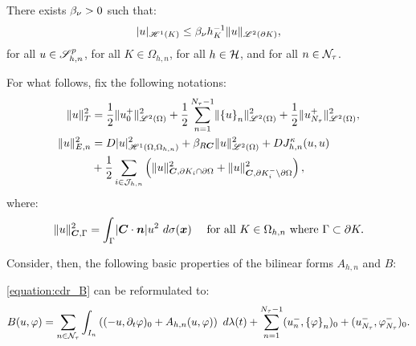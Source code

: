 \begin{lemma}
    There exists $\beta_{\nu} > 0$ such that:
    \begin{gather}
        \lvert u \rvert_{\mathscr{H}^{1}(K)} \leq \beta_{\nu} h_K^{-1} \lVert u \rVert_{\mathscr{L}^{2}(\partial K)},
    \end{gather}
    for all $u \in \mathscr{S}^p_{h, n}$, for all $K \in \Omega_{h, n}$, for all $h \in \mathcal{H}$, and for all $n \in \mathcal{N}_{\tau}$.
\end{lemma}

For what follows, fix the following notations:
\begin{align} %
    \lVert u \rVert_{T}^2 &= \frac{1}{2} \lVert u_0^+ \rVert_{\SpaceLp{2}(\Omega)}^2 + \frac{1}{2} \sum_{n = 1}^{\nTimeIndices - 1} \lVert \left\{ u \right\}_n \rVert_{\SpaceLp{2}(\Omega)}^2 + \frac{1}{2} \lVert u_{\nTimeIndices}^+ \rVert_{\SpaceLp{2}(\Omega)}^2, \\
    \lVert u \rVert_{E, n}^2 &= \Diffusion \lvert u \rvert_{\SpaceHk{1}(\Omega, \Omega_{h, n})}^2 + \BoundC{\Reaction \Convection} \lVert u \rVert_{\SpaceLp{2}(\Omega)}^2 + \Diffusion J^{\kappa}_{h, n}(u, u) \\
    &+ \frac{1}{2} \sum_{i \in \SpaceTimeIndices} \left( \lVert u \rVert_{\Convection, \partial K_i \cap \partial \Omega}^2 + \lVert u \rVert_{\Convection, \partial K_i^- \setminus \partial \Omega}^2 \right),
\end{align}
where:
\begin{gather}
    \lVert u \rVert_{\bm{C}, \Gamma}^2 = \int_{\Gamma} \lvert \bm{C} \cdot \bm{n} \rvert u^2 ~ d \sigma(\bm{x}) \quad \text{ for all } K \in \Omega_{h, n} \text{ where } \Gamma \subset \partial K.
\end{gather}

Consider, then, the following basic properties of the bilinear forms $A_{h, n}$ and $B$:

\begin{lemma}[Reformulation of $B$]
    \cref{equation:cdr_B} can be reformulated to:
    \begin{gather}
        B(u, \varphi) = \sum_{n \in \mathcal{N}_{\tau}} \int_{I_n} \left( (-u, \partial_t \varphi )_0 + A_{h, n}(u, \varphi) \right) ~ d \lambda(t) + \sum_{n = 1}^{N_{\tau} - 1} (u_n^-, \left\{ \varphi \right\}_n )_0 + (u_{N_{\tau}}^-, \varphi_{N_{\tau}}^-)_0. \label{equation:cdr_B_reformulated}
    \end{gather}
\end{lemma}


